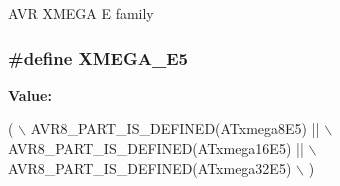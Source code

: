 A\-V\-R X\-M\-E\-G\-A E family \hypertarget{group__xmega__part__macros__group_ga3bbcf2e955c9747a3595f8cdc01436ba}{
\subsubsection[{X\-M\-E\-G\-A\-\_\-\-E5}]{\setlength{\rightskip}{0pt plus 5cm}\#define X\-M\-E\-G\-A\-\_\-\-E5}}\label{group__xmega__part__macros__group_ga3bbcf2e955c9747a3595f8cdc01436ba}
{\bfseries Value\-:}
\begin{DoxyCode}
( \(\backslash\)
                AVR8\_PART\_IS\_DEFINED(ATxmega8E5)   || \(\backslash\)
                AVR8\_PART\_IS\_DEFINED(ATxmega16E5)  || \(\backslash\)
                AVR8\_PART\_IS\_DEFINED(ATxmega32E5)     \(\backslash\)
        )
\end{DoxyCode}
